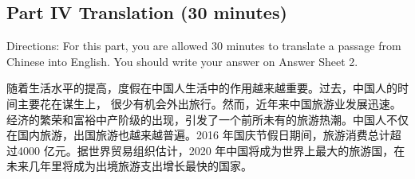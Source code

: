 \documentclass[UTF8,11pt]{ctexart}
\begin{document}
\subsection*{\textbf{Part} IV \textbf{Translation} \textbf{(30 minutes)}}


Directions: For this part, you are allowed 30 minutes to translate a passage from Chinese into English. You should write your answer on Answer Sheet 2.


随着生活水平的提高，度假在中国人生活中的作用越来越重要。过去，中国人的时间主要花在谋生上， 很少有机会外出旅行。然而，近年来中国旅游业发展迅速。经济的繁荣和富裕中产阶级的出现，引发了一个前所未有的旅游热潮。中国人不仅在国内旅游，出国旅游也越来越普遍。2016 年国庆节假日期间，旅游消费总计超过4000 亿元。据世界贸易组织估计，2020 年中国将成为世界上最大的旅游国，在未来几年里将成为出境旅游支出增长最快的国家。
\end{document}
